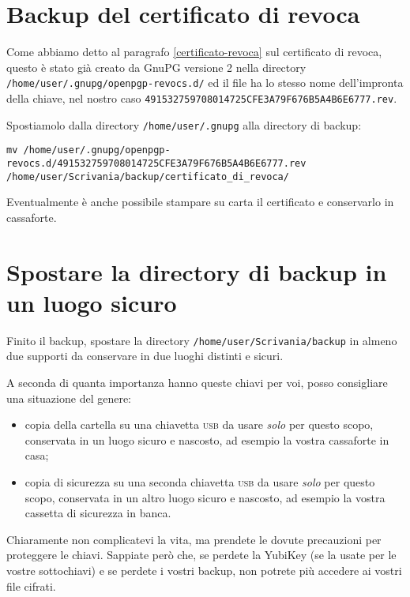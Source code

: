 \section{Backup del certificato di revoca} \label{backup-certificato-revoca}

Come abbiamo detto al paragrafo \vref{certificato-revoca} sul certificato di
revoca, questo è stato già creato da GnuPG versione 2 nella directory
\texttt{/home/user/.gnupg/openpgp-revocs.d/} ed il file ha lo stesso nome
dell'impronta della chiave, nel nostro caso \newline
\texttt{491532759708014725CFE3A79F676B5A4B6E6777.rev}.

Spostiamolo dalla directory \texttt{/home/user/.gnupg} alla directory di backup:

\begin{lstlisting}
mv /home/user/.gnupg/openpgp-revocs.d/491532759708014725CFE3A79F676B5A4B6E6777.rev /home/user/Scrivania/backup/certificato_di_revoca/
\end{lstlisting}

Eventualmente è anche possibile stampare su carta il certificato e conservarlo
in cassaforte.

\section{Spostare la directory di backup in un luogo sicuro}

Finito il backup, spostare la directory \texttt{/home/user/Scrivania/backup} in
almeno due supporti da conservare in due luoghi distinti e sicuri.

A seconda di quanta importanza hanno queste chiavi per voi, posso consigliare
una situazione del genere:

\begin{itemize}
 \item copia della cartella su una chiavetta \textsc{usb} da usare \emph{solo}
 per questo scopo, conservata in un luogo sicuro e nascosto, ad esempio la
 vostra cassaforte in casa;
 \item copia di sicurezza su una seconda chiavetta \textsc{usb} da usare
 \emph{solo} per questo scopo, conservata in un altro luogo sicuro e nascosto,
 ad esempio la vostra cassetta di sicurezza in banca.
\end{itemize}

Chiaramente non complicatevi la vita, ma prendete le dovute precauzioni per
proteggere le chiavi. Sappiate però che, se perdete la YubiKey (se la usate per
le vostre sottochiavi) e se perdete i vostri backup, non potrete più accedere ai
vostri file cifrati.
